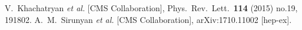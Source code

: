 \documentclass[a4paper,10pt]{article}
\begin{document}
\begin{thebibliography}{9}
  V.~Khachatryan {\it et al.} [CMS Collaboration],
  Phys.\ Rev.\ Lett.\  {\bf 114} (2015) no.19,  191802.
  A.~M.~Sirunyan {\it et al.} [CMS Collaboration],
  arXiv:1710.11002 [hep-ex].
 \end{thebibliography}
\end{document}
